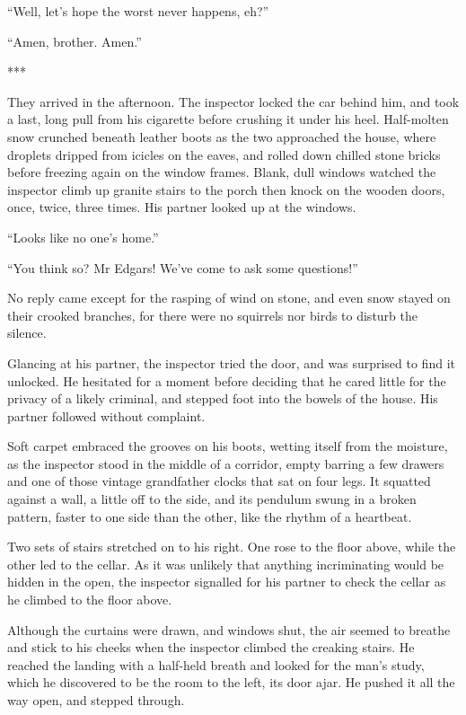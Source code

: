 “Well, let’s hope the worst never happens, eh?”

“Amen, brother. Amen.”

\centerline{***}

They arrived in the afternoon. The inspector locked the car behind him, and took a last, long pull from his cigarette before crushing it under his heel. Half-molten snow crunched beneath leather boots as the two approached the house, where droplets dripped from icicles on the eaves, and rolled down chilled stone bricks before freezing again on the window frames. Blank, dull windows watched the inspector climb up granite stairs to the porch then knock on the wooden doors, once, twice, three times. His partner looked up at the windows.

“Looks like no one’s home.”

“You think so? Mr Edgars! We’ve come to ask some questions!”

No reply came except for the rasping of wind on stone, and even snow stayed on their crooked branches, for there were no squirrels nor birds to disturb the silence.

Glancing at his partner, the inspector tried the door, and was surprised to find it unlocked. He hesitated for a moment before deciding that he cared little for the privacy of a likely criminal, and stepped foot into the bowels of the house. His partner followed without complaint.

Soft carpet embraced the grooves on his boots, wetting itself from the moisture, as the inspector stood in the middle of a corridor, empty barring a few drawers and one of those vintage grandfather clocks that sat on four legs. It squatted against a wall, a little off to the side, and its pendulum swung in a broken pattern, faster to one side than the other, like the rhythm of a heartbeat.

Two sets of stairs stretched on to his right. One rose to the floor above, while the other led to the cellar. As it was unlikely that anything incriminating would be hidden in the open, the inspector signalled for his partner to check the cellar as he climbed to the floor above.

Although the curtains were drawn, and windows shut, the air seemed to breathe and stick to his cheeks when the inspector climbed the creaking stairs. He reached the landing with a half-held breath and looked for the man’s study, which he discovered to be the room to the left, its door ajar. He pushed it all the way open, and stepped through.

